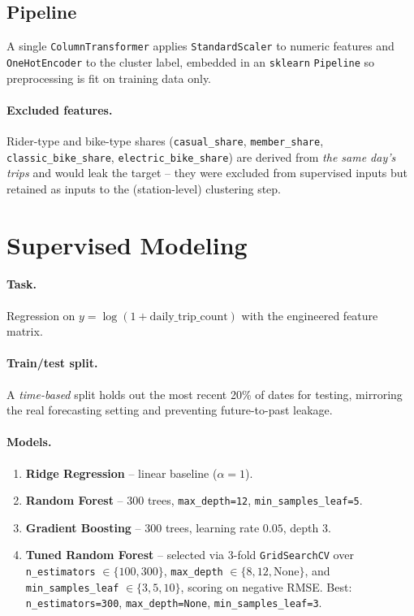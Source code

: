 \documentclass[11pt]{article}
\begin{document}
\subsection{Pipeline}
A single \texttt{ColumnTransformer} applies \texttt{StandardScaler} to numeric
features and \texttt{OneHotEncoder} to the cluster label, embedded in an
\texttt{sklearn} \texttt{Pipeline} so preprocessing is fit on training data
only.

\paragraph{Excluded features.}
Rider-type and bike-type shares (\texttt{casual\_share},
\texttt{member\_share}, \texttt{classic\_bike\_share},
\texttt{electric\_bike\_share}) are derived from \emph{the same day's trips}
and would leak the target -- they were excluded from supervised inputs but
retained as inputs to the (station-level) clustering step.

\section{Supervised Modeling}

\paragraph{Task.}
Regression on $y=\log(1+\text{daily\_trip\_count})$ with the engineered
feature matrix.

\paragraph{Train/test split.}
A \emph{time-based} split holds out the most recent 20\% of dates for testing,
mirroring the real forecasting setting and preventing future-to-past leakage.

\paragraph{Models.}
\begin{enumerate}[leftmargin=1.6em]
  \item \textbf{Ridge Regression} -- linear baseline ($\alpha=1$).
  \item \textbf{Random Forest} -- 300 trees, \texttt{max\_depth=12},
        \texttt{min\_samples\_leaf=5}.
  \item \textbf{Gradient Boosting} -- 300 trees, learning rate $0.05$,
        depth 3.
  \item \textbf{Tuned Random Forest} -- selected via 3-fold
        \texttt{GridSearchCV} over \texttt{n\_estimators} $\in\{100,300\}$,
        \texttt{max\_depth} $\in\{8,12,\text{None}\}$, and
        \texttt{min\_samples\_leaf} $\in\{3,5,10\}$, scoring on negative RMSE.
        Best: \texttt{n\_estimators=300}, \texttt{max\_depth=None},
        \texttt{min\_samples\_leaf=3}.
\end{enumerate}
\end{document}
